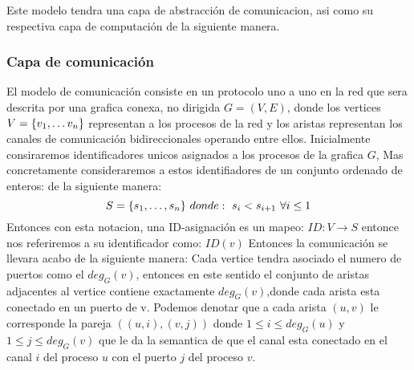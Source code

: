 \documentclass[10pt]{report}
\begin{document}
    Este modelo tendra una capa de abstracción de comunicacion, asi como su respectiva capa de
    computación de la siguiente manera.
    \subsubsection{Capa de comunicación}
    El modelo de comunicación consiste en un protocolo uno a uno en la red que sera descrita por
    una grafica conexa, no dirigida $G=(V,E)$, donde los vertices $V=\{ v_{1},\mathellipsis v_{n}\}$
    representan a los procesos de la red y los aristas representan los canales de comunicación bidireccionales
    operando entre ellos.
    Inicialmente consiraremos identificadores unicos asignados a los procesos de la grafica $G$,
    Mas concretamente consideraremos a estos identifiadores de un conjunto ordenado de enteros:
    de la siguiente manera:
    \begin{equation}
        S = \{ s_{1},\mathellipsis,s_{n}\} \
        donde:\ s_{i} < s_{i+1} \ \forall i\leq 1
    \end{equation}
    Entonces con esta notacion, una ID-asignación es un mapeo:
    $ID:V\rightarrow S$ entonce nos referiremos a su identificador como:
    $ID(v)$
    Entonces la comunicación se llevara acabo de la siguiente manera:
    Cada vertice tendra asociado el numero de puertos como el $deg_{G}(v)$,
    entonces en este sentido el conjunto de aristas adjacentes al vertice
    contiene exactamente $deg_{G}(v)$,donde cada arista esta conectado en un puerto de v.
    \space
    Podemos denotar que a cada arista $(u,v)$ le corresponde la pareja
    $((u,i),(v,j))$ donde $1\leq i \leq deg_{G}(u) $ y $1\leq j \leq deg_{G}(v)$
    que le da la semantica de que el canal esta conectado en el canal $i$ del proceso $u$
    con el puerto $j$ del proceso $v$.
\end{document}
